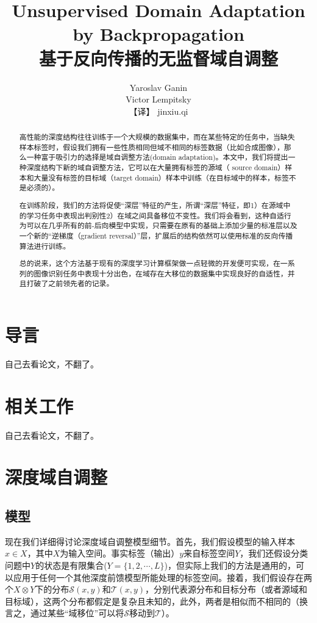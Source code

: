 \documentclass[UTF8]{ctexart}
\title{Unsupervised Domain Adaptation by Backpropagation\\基于反向传播的无监督域自调整}
\author{Yaroslav Ganin\\Victor Lempitsky\\ 【译】 jinxiu.qi}
\begin{document}
\maketitle
\begin{abstract}
高性能的深度结构往往训练于一个大规模的数据集中，而在某些特定的任务中，当缺失样本标签时，假设我们拥有一些性质相同但域不相同的标签数据（比如合成图像），那么一种富于吸引力的选择是域自调整方法(domain adaptation)。本文中，我们将提出一种深度结构下新的域自调整方法，它可以在大量拥有标签的源域（ source domain）样本和大量没有标签的目标域（target domain）样本中训练（在目标域中的样本，标签不是必须的）。

在训练阶段，我们的方法将促使“深层”特征的产生，所谓“深层”特征，即1）在源域中的学习任务中表现出判别性2）在域之间具备移位不变性。我们将会看到，这种自适行为可以在几乎所有的前-后向模型中实现，只需要在原有的基础上添加少量的标准层以及一个新的“逆梯度（gradient  reversal）”层，扩展后的结构依然可以使用标准的反向传播算法进行训练。

总的说来，这个方法基于现有的深度学习计算框架做一点轻微的开发便可实现，在一系列的图像识别任务中表现十分出色，在域存在大移位的数据集中实现良好的自适性，并且打破了之前领先者的记录。
\end{abstract}

\section{导言}
自己去看论文，不翻了。
\section{相关工作}
自己去看论文，不翻了。
\section{深度域自调整}
\subsection{模型}
现在我们详细得讨论深度域自调整模型细节。首先，我们假设模型的输入样本$x \in X$，其中$X$为输入空间。事实标签（输出）$y$来自标签空间$Y$，我们还假设分类问题中$Y$的状态是有限集合($Y = \{1, 2, \cdots, L\}$)，但实际上我们的方法是通用的，可以应用于任何一个其他深度前馈模型所能处理的标签空间。接着，我们假设存在两个$X\otimes Y$下的分布$\mathcal{S}(x, y)$和$\mathcal{T}(x, y)$，分别代表源分布和目标分布（或者源域和目标域），这两个分布都假定是复杂且未知的，此外，两者是相似而不相同的（换言之，通过某些“域移位”可以将$\mathcal{S}$移动到$\mathcal{T}$）。
\end{document}

